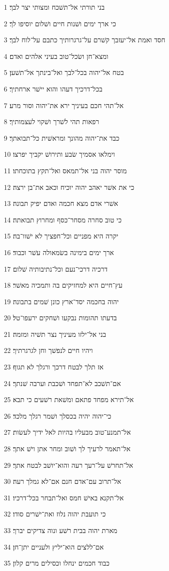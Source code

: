 \par 1 בני תורתי אל־תשׁכח ומצותי יצר לבך׃
\par 2 כי ארך ימים ושׁנות חיים ושׁלום יוסיפו לך׃
\par 3 חסד ואמת אל־יעזבך קשׁרם על־גרגרותיך כתבם על־לוח לבך׃
\par 4 ומצא־חן ושׂכל־טוב בעיני אלהים ואדם׃
\par 5 בטח אל־יהוה בכל־לבך ואל־בינתך אל־תשׁען׃
\par 6 בכל־דרכיך דעהו והוא יישׁר ארחתיך׃
\par 7 אל־תהי חכם בעיניך ירא את־יהוה וסור מרע׃
\par 8 רפאות תהי לשׁרך ושׁקוי לעצמותיך׃
\par 9 כבד את־יהוה מהונך ומראשׁית כל־תבואתך׃
\par 10 וימלאו אסמיך שׂבע ותירושׁ יקביך יפרצו׃
\par 11 מוסר יהוה בני אל־תמאס ואל־תקץ בתוכחתו׃
\par 12 כי את אשׁר יאהב יהוה יוכיח וכאב את־בן ירצה׃
\par 13 אשׁרי אדם מצא חכמה ואדם יפיק תבונה׃
\par 14 כי טוב סחרה מסחר־כסף ומחרוץ תבואתה׃
\par 15 יקרה היא מפניים וכל־חפציך לא ישׁוו־בה׃
\par 16 ארך ימים בימינה בשׂמאולה עשׁר וכבוד׃
\par 17 דרכיה דרכי־נעם וכל־נתיבותיה שׁלום׃
\par 18 עץ־חיים היא למחזיקים בה ותמכיה מאשׁר׃
\par 19 יהוה בחכמה יסד־ארץ כונן שׁמים בתבונה׃
\par 20 בדעתו תהומות נבקעו ושׁחקים ירעפו־טל׃
\par 21 בני אל־ילזו מעיניך נצר תשׁיה ומזמה׃
\par 22 ויהיו חיים לנפשׁך וחן לגרגרתיך׃
\par 23 אז תלך לבטח דרכך ורגלך לא תגוף׃
\par 24 אם־תשׁכב לא־תפחד ושׁכבת וערבה שׁנתך׃
\par 25 אל־תירא מפחד פתאם ומשׁאת רשׁעים כי תבא׃
\par 26 כי־יהוה יהיה בכסלך ושׁמר רגלך מלכד׃
\par 27 אל־תמנע־טוב מבעליו בהיות לאל ידיך לעשׂות׃
\par 28 אל־תאמר לרעיך לך ושׁוב ומחר אתן וישׁ אתך׃
\par 29 אל־תחרשׁ על־רעך רעה והוא־יושׁב לבטח אתך׃
\par 30 אל־תרוב עם־אדם חנם אם־לא גמלך רעה׃
\par 31 אל־תקנא באישׁ חמס ואל־תבחר בכל־דרכיו׃
\par 32 כי תועבת יהוה נלוז ואת־ישׁרים סודו׃
\par 33 מארת יהוה בבית רשׁע ונוה צדיקים יברך׃
\par 34 אם־ללצים הוא־יליץ ולעניים יתן־חן׃
\par 35 כבוד חכמים ינחלו וכסילים מרים קלון׃

